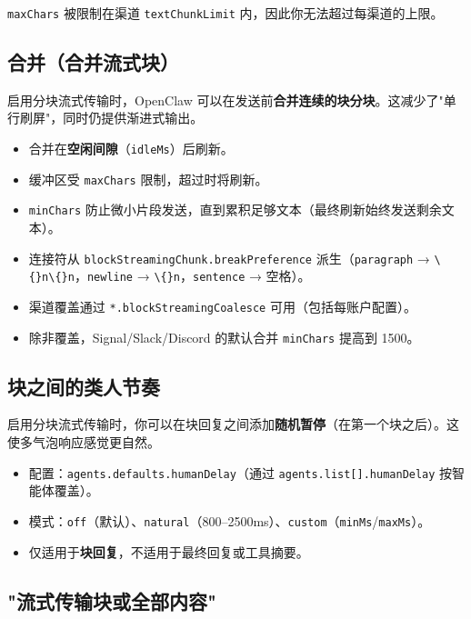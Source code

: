 \texttt{maxChars} 被限制在渠道 \texttt{textChunkLimit} 内，因此你无法超过每渠道的上限。

\subsection{合并（合并流式块）}


启用分块流式传输时，OpenClaw 可以在发送前\textbf{合并连续的块分块}。这减少了"单行刷屏"，同时仍提供渐进式输出。

\begin{itemize}
  \item 合并在\textbf{空闲间隙}（\texttt{idleMs}）后刷新。
  \item 缓冲区受 \texttt{maxChars} 限制，超过时将刷新。
  \item \texttt{minChars} 防止微小片段发送，直到累积足够文本（最终刷新始终发送剩余文本）。
  \item 连接符从 \texttt{blockStreamingChunk.breakPreference} 派生（\texttt{paragraph} → \texttt{\textbackslash\{\}n\textbackslash\{\}n}，\texttt{newline} → \texttt{\textbackslash\{\}n}，\texttt{sentence} → 空格）。
  \item 渠道覆盖通过 \texttt{*.blockStreamingCoalesce} 可用（包括每账户配置）。
  \item 除非覆盖，Signal/Slack/Discord 的默认合并 \texttt{minChars} 提高到 1500。
\end{itemize}


\subsection{块之间的类人节奏}


启用分块流式传输时，你可以在块回复之间添加\textbf{随机暂停}（在第一个块之后）。这使多气泡响应感觉更自然。

\begin{itemize}
  \item 配置：\texttt{agents.defaults.humanDelay}（通过 \texttt{agents.list[].humanDelay} 按智能体覆盖）。
  \item 模式：\texttt{off}（默认）、\texttt{natural}（800–2500ms）、\texttt{custom}（\texttt{minMs}/\texttt{maxMs}）。
  \item 仅适用于\textbf{块回复}，不适用于最终回复或工具摘要。
\end{itemize}


\subsection{"流式传输块或全部内容"}


